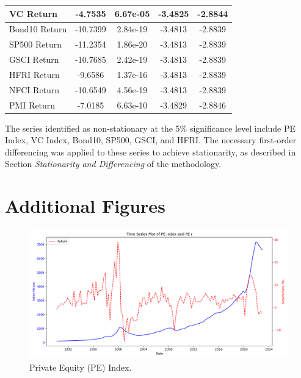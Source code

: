 \documentclass[12pt]{article}
\begin{document}
\begin{table}[h!]
\begin{tabular}{|l|c|c|c|c|}
VC Return       & -4.7535                & 6.67e-05         & -3.4825                      & -2.8844                      \\ \hline
Bond10 Return   & -10.7399               & 2.84e-19         & -3.4813                      & -2.8839                      \\ \hline
SP500 Return    & -11.2354               & 1.86e-20         & -3.4813                      & -2.8839                      \\ \hline
GSCI Return     & -10.7685               & 2.42e-19         & -3.4813                      & -2.8839                      \\ \hline
HFRI Return     & -9.6586                & 1.37e-16         & -3.4813                      & -2.8839                      \\ \hline
NFCI Return     & -10.6549               & 4.56e-19         & -3.4813                      & -2.8839                      \\ \hline
PMI Return      & -7.0185                & 6.63e-10         & -3.4829                      & -2.8846                      \\ \hline
\end{tabular}
\end{table}

The series identified as non-stationary at the 5\% significance level include PE Index, VC Index, Bond10, SP500, GSCI, and HFRI. The necessary first-order differencing was applied to these series to achieve stationarity, as described in Section \textit{Stationarity and Differencing} of the methodology.






\section{Additional Figures}


\begin{figure}[H]
    \centering
    \includegraphics[width=1\linewidth]{plot_PE_index.png}
    \caption{Private Equity (PE) Index.}
    \label{fig:pe_index}
\end{figure}
\end{document}

